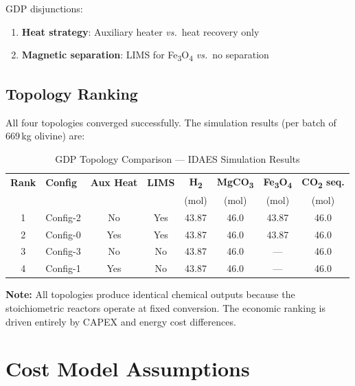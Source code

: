 \documentclass[11pt,a4paper]{article}
\begin{document}
GDP disjunctions:
\begin{enumerate}[noitemsep]
  \item \textbf{Heat strategy}: Auxiliary heater \textit{vs.}\ heat recovery only
  \item \textbf{Magnetic separation}: LIMS for Fe\textsubscript{3}O\textsubscript{4} \textit{vs.}\ no separation
\end{enumerate}

\subsection{Topology Ranking}

All four topologies converged successfully. The simulation results (per batch of 669\,kg olivine) are:

\begin{table}[H]
\centering
\caption{GDP Topology Comparison --- IDAES Simulation Results}
\label{tab:ranking}
\begin{tabular}{clcccccc}
\toprule
\textbf{Rank} & \textbf{Config} & \textbf{Aux Heat} & \textbf{LIMS} & \textbf{H\textsubscript{2}} & \textbf{MgCO\textsubscript{3}} & \textbf{Fe\textsubscript{3}O\textsubscript{4}} & \textbf{CO\textsubscript{2} seq.} \\
 & & & & (mol) & (mol) & (mol) & (mol) \\
\midrule
1 & Config-2 & No  & Yes & 43.87 & 46.0 & 43.87 & 46.0 \\
2 & Config-0 & Yes & Yes & 43.87 & 46.0 & 43.87 & 46.0 \\
3 & Config-3 & No  & No  & 43.87 & 46.0 & ---   & 46.0 \\
4 & Config-1 & Yes & No  & 43.87 & 46.0 & ---   & 46.0 \\
\bottomrule
\end{tabular}
\end{table}

\textbf{Note:} All topologies produce identical chemical outputs because the stoichiometric reactors operate at fixed conversion.
The economic ranking is driven entirely by CAPEX and energy cost differences.

\section{Cost Model Assumptions}
\end{document}
